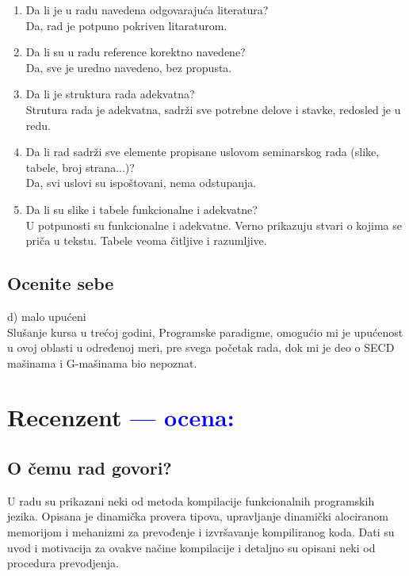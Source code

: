 \documentclass[a4paper]{report}
\newcommand{\odgovor}[1]{\textcolor{blue}{#1}}
\begin{document}
\begin{enumerate}
\item Da li je u radu navedena odgovarajuća literatura?\\
Da, rad je potpuno pokriven litaraturom.
\item Da li su u radu reference korektno navedene?\\
Da, sve je uredno navedeno, bez propusta.
\item Da li je struktura rada adekvatna?\\
Strutura rada je adekvatna, sadrži sve potrebne delove i stavke, redosled je u redu.
\item Da li rad sadrži sve elemente propisane uslovom seminarskog rada (slike, tabele, broj strana...)?\\
Da, svi uslovi su ispoštovani, nema odstupanja.
\item Da li su slike i tabele funkcionalne i adekvatne? \\
U potpunosti su funkcionalne i adekvatne. Verno prikazuju stvari o kojima se priča u tekstu. Tabele veoma čitljive i razumljive.
\end{enumerate}

\section{Ocenite sebe}
 d) malo upućeni  \\ 
Slušanje kursa u trećoj godini, Programske paradigme, omogućio mi je upućenost u ovoj oblasti u određenoj meri, pre svega početak rada, dok mi je deo o SECD mašinama i G-mašinama bio nepoznat.


\chapter{Recenzent \odgovor{--- ocena:} }


\section{O čemu rad govori?}
U radu su prikazani neki od metoda kompilacije funkcionalnih programskih jezika.
Opisana je dinamička provera tipova, upravljanje dinamički alociranom memorijom i mehanizmi za prevođenje i izvršavanje kompiliranog koda. Dati su uvod i motivacija za ovakve načine kompilacije i detaljno su opisani neki od procedura prevodjenja.
\end{document}
